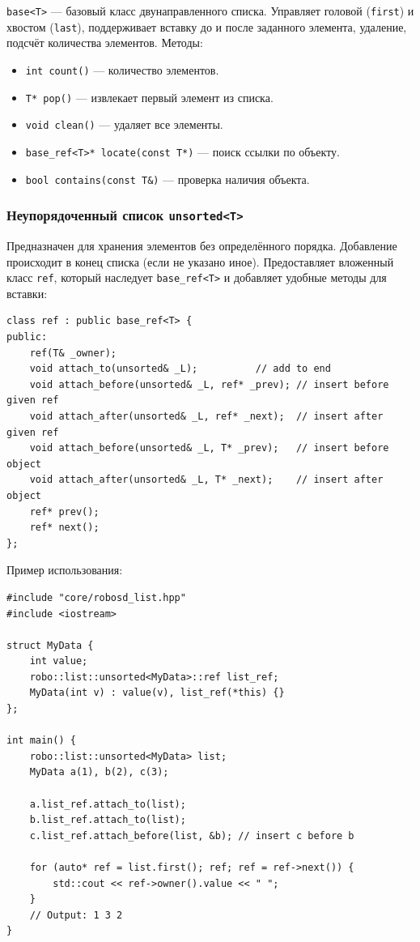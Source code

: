 \documentclass[a4paper,12pt]{article}
\begin{document}
\texttt{base<T>} — базовый класс двунаправленного списка. Управляет головой (\texttt{first}) и хвостом (\texttt{last}), поддерживает вставку до и после заданного элемента, удаление, подсчёт количества элементов. Методы:
\begin{itemize}
    \item \texttt{int count()} — количество элементов.
    \item \texttt{T* pop()} — извлекает первый элемент из списка.
    \item \texttt{void clean()} — удаляет все элементы.
    \item \texttt{base\_ref<T>* locate(const T*)} — поиск ссылки по объекту.
    \item \texttt{bool contains(const T\&)} — проверка наличия объекта.
\end{itemize}

\subsubsection{Неупорядоченный список \texttt{unsorted<T>}}

Предназначен для хранения элементов без определённого порядка. Добавление происходит в конец списка (если не указано иное). Предоставляет вложенный класс \texttt{ref}, который наследует \texttt{base\_ref<T>} и добавляет удобные методы для вставки:

\begin{lstlisting}[caption={Интерфейс unsorted::ref}]
class ref : public base_ref<T> {
public:
    ref(T& _owner);
    void attach_to(unsorted& _L);          // add to end
    void attach_before(unsorted& _L, ref* _prev); // insert before given ref
    void attach_after(unsorted& _L, ref* _next);  // insert after given ref
    void attach_before(unsorted& _L, T* _prev);   // insert before object
    void attach_after(unsorted& _L, T* _next);    // insert after object
    ref* prev();
    ref* next();
};
\end{lstlisting}

Пример использования:

\begin{lstlisting}[caption={Неупорядоченный список}]
#include "core/robosd_list.hpp"
#include <iostream>

struct MyData {
    int value;
    robo::list::unsorted<MyData>::ref list_ref;
    MyData(int v) : value(v), list_ref(*this) {}
};

int main() {
    robo::list::unsorted<MyData> list;
    MyData a(1), b(2), c(3);

    a.list_ref.attach_to(list);
    b.list_ref.attach_to(list);
    c.list_ref.attach_before(list, &b); // insert c before b

    for (auto* ref = list.first(); ref; ref = ref->next()) {
        std::cout << ref->owner().value << " ";
    }
    // Output: 1 3 2
}
\end{lstlisting}
\end{document}
